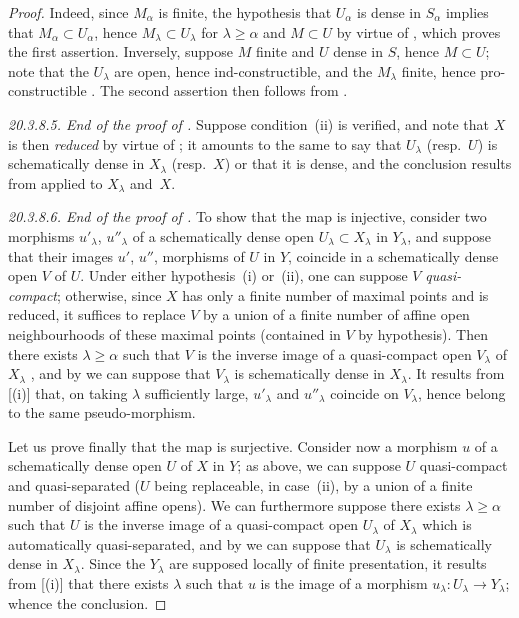 \begin{proof}
Indeed, since $M_\alpha$ is finite, the hypothesis that $U_\alpha$ is dense in $S_\alpha$ implies that
$M_\alpha\subset U_\alpha$, hence $M_\lambda\subset U_\lambda$ for $\lambda\geq\alpha$ and $M\subset U$ by virtue of , which proves the first assertion.
Inversely, suppose $M$ finite and $U$ dense in $S$, hence $M\subset U$; note that the $U_\lambda$ are open, hence ind-constructible, and the $M_\lambda$ finite, hence pro-constructible .
The second assertion then follows from .

\label{IV.20.3.8.5}
\emph{20.3.8.5. End of the proof of .}
Suppose condition~(ii) is verified, and note that $X$ is then \emph{reduced} by virtue of ;
it amounts to the same to say that $U_\lambda$ (resp.\ $U$) is schematically dense in $X_\lambda$ (resp.\ $X$) or that it is dense, and the conclusion results from  applied to $X_\lambda$ and~$X$.

\label{IV.20.3.8.6}
\emph{20.3.8.6. End of the proof of .}
To show that the map  is injective, consider two morphisms $u'_\lambda$, $u''_\lambda$ of a schematically dense open $U_\lambda\subset X_\lambda$ in $Y_\lambda$, and suppose that their images $u'$, $u''$, morphisms of $U$ in $Y$, coincide in a schematically dense open $V$ of $U$.
Under either hypothesis~(i) or~(ii), one can suppose $V$ \emph{quasi-compact};
otherwise, since $X$ has only a finite number of maximal points and is reduced, it suffices to replace $V$ by a union of a finite number of affine open neighbourhoods of these maximal points (contained in $V$ by hypothesis).
Then there exists $\lambda\geq\alpha$ such that $V$ is the inverse image of a quasi-compact open $V_\lambda$ of $X_\lambda$ , and by  we can suppose that $V_\lambda$ is schematically dense in $X_\lambda$.
It results from [(i)] that, on taking $\lambda$ sufficiently large, $u'_\lambda$ and $u''_\lambda$ coincide on $V_\lambda$, hence belong to the same pseudo-morphism.

Let us prove finally that the map  is surjective.
Consider now a morphism $u$ of a schematically dense open $U$ of $X$ in $Y$;
as above, we can suppose $U$ quasi-compact and quasi-separated ($U$ being replaceable, in case~(ii), by a union of a finite number of disjoint affine opens).
We can furthermore suppose there exists $\lambda\geq\alpha$ such that $U$ is the inverse image of a quasi-compact open $U_\lambda$ of $X_\lambda$  which is automatically quasi-separated, and by  we can suppose that $U_\lambda$ is schematically dense in $X_\lambda$.
Since the $Y_\lambda$ are supposed locally of finite presentation, it results from [(i)] that there exists $\lambda$ such that $u$ is the image of a morphism $u_\lambda:U_\lambda\to Y_\lambda$; whence the conclusion.


\end{proof}
